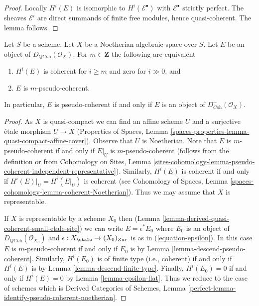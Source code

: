 \begin{proof}
Locally $H^i(E)$ is isomorphic to $H^i(\mathcal{E}^\bullet)$
with $\mathcal{E}^\bullet$ strictly perfect. The sheaves
$\mathcal{E}^i$ are direct summands of finite free modules,
hence quasi-coherent. The lemma follows.
\end{proof}

\begin{lemma}
\label{lemma-identify-pseudo-coherent-noetherian}
Let $S$ be a scheme. Let $X$ be a Noetherian algebraic space over $S$.
Let $E$ be an object of $D_{\textit{QCoh}}(\mathcal{O}_X)$. For
$m \in \mathbf{Z}$ the following are equivalent
\begin{enumerate}
\item $H^i(E)$ is coherent for $i \geq m$ and zero for $i \gg 0$, and
\item $E$ is $m$-pseudo-coherent.
\end{enumerate}
In particular, $E$ is pseudo-coherent if and only if $E$ is an object
of $D^-_{\textit{Coh}}(\mathcal{O}_X)$.
\end{lemma}

\begin{proof}
As $X$ is quasi-compact we can find an affine scheme $U$ and a surjective
\'etale morphism $U \to X$ (Properties of Spaces, Lemma
\ref{spaces-properties-lemma-quasi-compact-affine-cover}).
Observe that $U$ is Noetherian.
Note that $E$ is $m$-pseudo-coherent if and only if $E|_U$ is
$m$-pseudo-coherent (follows from the definition or from
Cohomology on Sites, Lemma
\ref{sites-cohomology-lemma-pseudo-coherent-independent-representative}).
Similarly, $H^i(E)$ is coherent if and only if $H^i(E)|_U = H^i(E|_U)$
is coherent (see Cohomology of Spaces, Lemma
\ref{spaces-cohomology-lemma-coherent-Noetherian}).
Thus we may assume that $X$ is representable.

\medskip\noindent
If $X$ is representable by a scheme $X_0$ then
(Lemma \ref{lemma-derived-quasi-coherent-small-etale-site})
we can write $E = \epsilon^*E_0$ where $E_0$ is an object of
$D_{\textit{QCoh}}(\mathcal{O}_{X_0})$ and
$\epsilon : X_\etale \to (X_0)_{Zar}$ is as in
(\ref{equation-epsilon}).
In this case $E$ is $m$-pseudo-coherent
if and only if $E_0$ is by Lemma \ref{lemma-descend-pseudo-coherent}.
Similarly, $H^i(E_0)$ is of finite type (i.e., coherent) if and only if
$H^i(E)$ is by Lemma \ref{lemma-descend-finite-type}.
Finally, $H^i(E_0) = 0$ if and only if $H^i(E) = 0$ by
Lemma \ref{lemma-epsilon-flat}.
Thus we reduce to the case of schemes which is
Derived Categories of Schemes, Lemma
\ref{perfect-lemma-identify-pseudo-coherent-noetherian}.
\end{proof}

